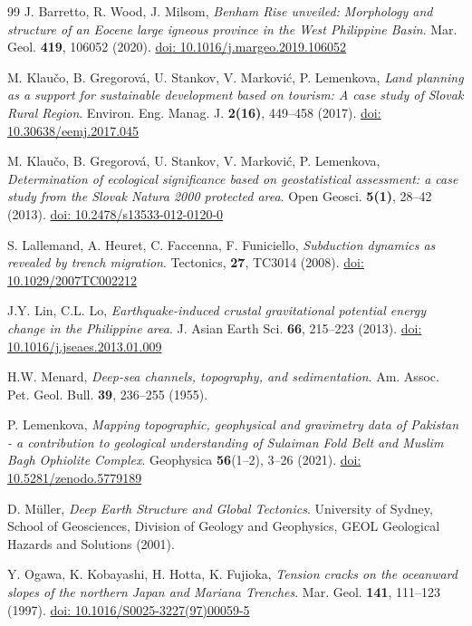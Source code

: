 \documentclass{rrparticle}
\begin{document}
\begin{thebibliography}{99}
 J. Barretto, R. Wood, J. Milsom, \emph{Benham Rise unveiled: Morphology and structure of an Eocene large igneous province in the West Philippine Basin}. Mar. Geol. \textbf {419}, 106052 (2020). \href{https://doi.org/10.1016/j.margeo.2019.106052}{doi: 10.1016/j.margeo.2019.106052}

 M. Klaučo, B. Gregorová, U. Stankov, V. Marković, P. Lemenkova, \emph{Land planning as a support for sustainable development based on tourism: A case study of Slovak Rural Region}. Environ. Eng. Manag. J. \textbf{2(16)}, 449--458 (2017). \href{https://doi.org/10.30638/eemj.2017.045}{doi: 10.30638/eemj.2017.045} 

 M. Klaučo, B. Gregorová, U. Stankov, V. Marković, P. Lemenkova, \emph{Determination of ecological significance based on geostatistical assessment: a case study from the Slovak Natura 2000 protected area}. Open Geosci. \textbf{5(1)}, 28--42 (2013). \href{https://doi.org/10.2478/s13533-012-0120-0}{doi: 10.2478/s13533-012-0120-0}

S. Lallemand, A. Heuret, C. Faccenna, F. Funiciello, \emph{Subduction dynamics as revealed by trench migration}. Tectonics, \textbf{27}, TC3014 (2008). \href{https://doi.org/10.1029/2007TC002212}{doi: 10.1029/2007TC002212}

 J.Y. Lin, C.L. Lo, \emph{Earthquake-induced crustal gravitational potential energy change in the Philippine area}. J. Asian Earth Sci. \textbf{66}, 215--223 (2013). \href{https://doi.org/10.1016/j.jseaes.2013.01.009}{doi: 10.1016/j.jseaes.2013.01.009}

 H.W. Menard, \emph{Deep-sea channels, topography, and sedimentation}. Am. Assoc. Pet. Geol. Bull. \textbf{39}, 236--255 (1955).

P. Lemenkova, \emph{Mapping topographic, geophysical and gravimetry data of Pakistan - a contribution to geological understanding of Sulaiman Fold Belt and Muslim Bagh Ophiolite Complex}. Geophysica \textbf{56}(1--2), 3--26 (2021). \href{https://doi.org/10.5281/zenodo.5779189}{doi: 10.5281/zenodo.5779189}

 D. Müller, \emph{Deep Earth Structure and Global Tectonics}. University of Sydney, School of Geosciences, Division of Geology and Geophysics, GEOL Geological Hazards and Solutions (2001).

 Y. Ogawa, K. Kobayashi, H. Hotta, K. Fujioka, \emph{Tension cracks on the oceanward slopes of the northern Japan and Mariana Trenches}. Mar. Geol. \textbf{141}, 111--123 (1997). \href{https://doi.org/10.1016/S0025-3227(97)00059-5}{doi: 10.1016/S0025-3227(97)00059-5}


\end{thebibliography}
\end{document}
